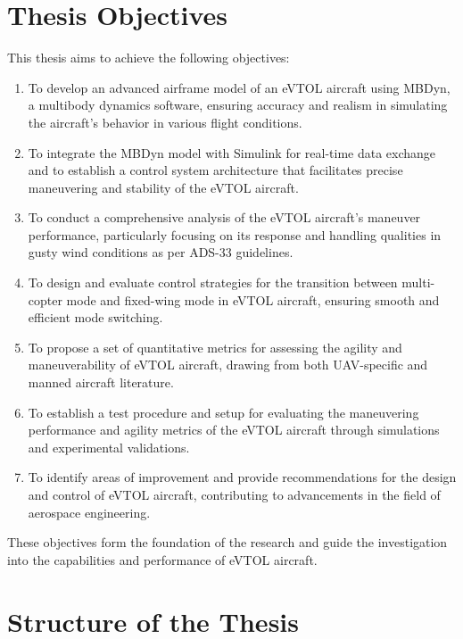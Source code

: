 \documentclass{Configuration_Files/PoliMi3i_thesis}
\begin{document}
\section*{Thesis Objectives}

This thesis aims to achieve the following objectives:

\begin{enumerate}
    \item To develop an advanced airframe model of an eVTOL aircraft using MBDyn, a multibody dynamics software, ensuring accuracy and realism in simulating the aircraft's behavior in various flight conditions.
    
    \item To integrate the MBDyn model with Simulink for real-time data exchange and to establish a control system architecture that facilitates precise maneuvering and stability of the eVTOL aircraft.
    
    \item To conduct a comprehensive analysis of the eVTOL aircraft's maneuver performance, particularly focusing on its response and handling qualities in gusty wind conditions as per ADS-33 guidelines.
    
    \item To design and evaluate control strategies for the transition between multi-copter mode and fixed-wing mode in eVTOL aircraft, ensuring smooth and efficient mode switching.
    
    \item To propose a set of quantitative metrics for assessing the agility and maneuverability of eVTOL aircraft, drawing from both UAV-specific and manned aircraft literature.
    
    \item To establish a test procedure and setup for evaluating the maneuvering performance and agility metrics of the eVTOL aircraft through simulations and experimental validations.
    
    \item To identify areas of improvement and provide recommendations for the design and control of eVTOL aircraft, contributing to advancements in the field of aerospace engineering.
\end{enumerate}

These objectives form the foundation of the research and guide the investigation into the capabilities and performance of eVTOL aircraft.

\section*{Structure of the Thesis}
\end{document}
